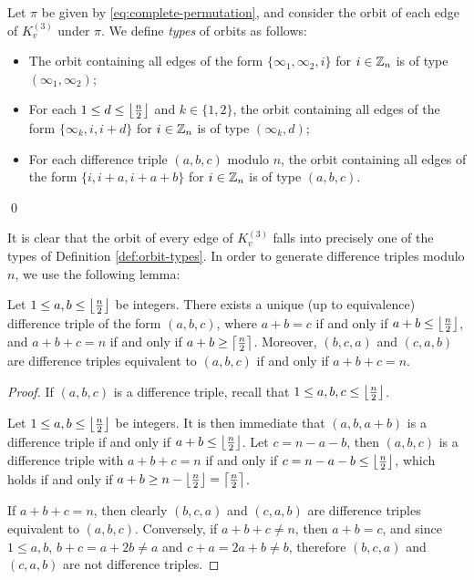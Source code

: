 \begin{definition} \label{def:orbit-types}
Let $\pi$ be given by \eqref{eq:complete-permutation}, and consider the orbit of each edge of $K_{v}^{(3)}$ under $\pi$.
We define {\em types} of orbits as follows:

\begin{itemize}
    \item The orbit containing all edges of the form $\{\infty_1, \infty_2, i\}$ for $i \in \mathbb{Z}_n$ is of type $(\infty_1, \infty_2)$;
    \item For each $1 \leq d \leq \left\lfloor \frac{n}{2} \right\rfloor$ and $k \in \{1, 2\}$, the orbit containing all edges of the form $\{\infty_k, i, i+d\}$ for $i \in \mathbb{Z}_n$ is of type $(\infty_k, d)$;
    \item For each difference triple $(a, b, c)$ modulo $n$, the orbit containing all edges of the form $\{i, i+a, i+a+b\}$ for $i \in \mathbb{Z}_n$ is of type $(a, b, c)$.
\end{itemize}
\qed
\end{definition}

It is clear that the orbit of every edge of $K_{v}^{(3)}$ falls into precisely one of the types of Definition \ref{def:orbit-types}.
In order to generate difference triples modulo $n$, we use the following lemma:

\begin{lemma} \label{lem:diff-triple-existence}
Let $1 \leq a,b \leq \left\lfloor \frac{n}{2} \right\rfloor$ be integers.
There exists a unique (up to equivalence) difference triple of the form $(a, b, c)$, where
$a + b = c$ if and only if $a + b \leq \left\lfloor \frac{n}{2} \right\rfloor$, and $a + b + c = n$ if and only if $a + b \geq \left\lceil \frac{n}{2} \right\rceil$.
Moreover, $(b, c, a)$ and $(c, a, b)$ are difference triples equivalent to $(a, b, c)$ if and only if $a + b + c = n$.
\end{lemma}

\begin{proof}
If $(a, b, c)$ is a difference triple, recall that $1 \leq a,b,c \leq \left\lfloor \frac{n}{2} \right\rfloor$.

Let $1 \leq a,b \leq \left\lfloor \frac{n}{2} \right\rfloor$ be integers.
It is then immediate that $(a, b, a+b)$ is a difference triple if and only if $a + b \leq \left\lfloor \frac{n}{2} \right\rfloor$.
Let $c = n-a-b$, then $(a, b, c)$ is a difference triple with $a + b + c = n$ if and only if $c = n - a - b \leq \left\lfloor \frac{n}{2} \right\rfloor$, which holds if and only if $a + b \geq n - \left\lfloor \frac{n}{2} \right\rfloor = \left\lceil \frac{n}{2} \right\rceil$.

If $a + b + c = n$, then clearly $(b, c, a)$ and $(c, a, b)$ are difference triples equivalent to $(a, b, c)$.
Conversely, if $a + b + c \neq n$, then $a + b = c$, and since $1 \leq a,b$, $b + c = a + 2b \neq a$ and $c + a = 2a + b \neq b$, therefore $(b, c, a)$ and $(c, a, b)$ are not difference triples.
\end{proof}

